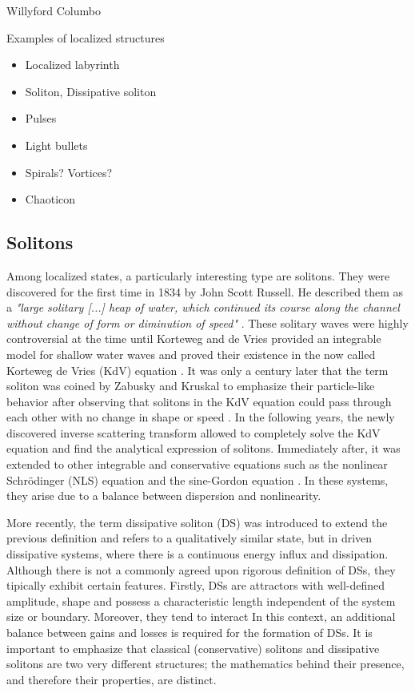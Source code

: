 Willyford Columbo

Examples of localized structures
\begin{itemize}
    \item Localized labyrinth
    \item Soliton, Dissipative soliton
    \item Pulses
    \item Light bullets
    \item Spirals? Vortices?
    \item Chaoticon
\end{itemize}


\subsection{Solitons}

Among localized states, a particularly interesting type are solitons. They were discovered
 for the first time in 1834 by John Scott Russell. He described them 
 as a {\em "large solitary [...] heap of water, which continued its course along the channel without change of form
or diminution of speed"} \cite{russell1845report}. These solitary waves were highly controversial
at the time until Korteweg and de Vries provided an integrable model for shallow water waves
and proved their existence in the now called Korteweg de Vries (KdV) equation \cite{korteweg1895xli}.
It was only a century later that the term soliton was coined by Zabusky and Kruskal
to emphasize their particle-like behavior after observing that solitons in the KdV equation could pass through each
other with no change in shape or speed \cite{zabusky1965interaction}. In the following
years, the newly discovered inverse scattering transform \cite{gardner1967method, gardner1974korteweg}
allowed to completely solve the KdV equation and find the analytical expression of solitons.
Immediately after, it was extended to other integrable and conservative equations such as the nonlinear Schrödinger (NLS)
equation \cite{shabat1972exact} and the sine-Gordon equation \cite{ablowitz1973method}. 
In these systems, they arise due to a balance between dispersion and nonlinearity. 


More recently, the term dissipative soliton (DS) was introduced to extend the previous definition
and refers to a qualitatively
similar state, but in driven dissipative systems, where there is a continuous energy influx and 
dissipation. Although there is not a commonly agreed upon rigorous definition of DSs, they tipically
exhibit certain features. Firstly, DSs are attractors with well-defined amplitude, shape and
possess a characteristic length independent of the system size or boundary. Moreover, they tend to
interact 
In this context, an additional balance between gains and losses is required for the formation
of DSs. It is important to emphasize that classical (conservative) solitons and dissipative solitons
are two very different structures; the mathematics behind their presence, and therefore their
properties, are distinct.



